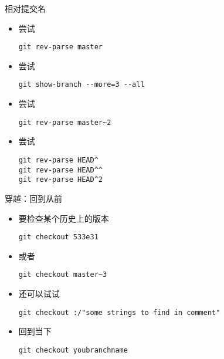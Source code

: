 \begin{frame}[<+->][fragile]{相对提交名}
    \begin{itemize}
        \item 尝试
\begin{Verbatim}[frame=single,commandchars=\\\{\}]
git rev-parse master
\end{Verbatim}
        \item 尝试
\begin{Verbatim}[frame=single,commandchars=\\\{\}]
git show-branch --more=3 --all
\end{Verbatim}
        \item 尝试
\begin{Verbatim}[frame=single,commandchars=\\\{\}]
git rev-parse master~2
\end{Verbatim}
        \item 尝试
\begin{Verbatim}[frame=single,commandchars=\\\{\}]
git rev-parse HEAD^
git rev-parse HEAD^^
git rev-parse HEAD^2
\end{Verbatim}
    \end{itemize}
\end{frame}

\begin{frame}[<+->][fragile]{穿越：回到从前}
    \begin{itemize}
        \item 要检查某个历史上的版本
\begin{Verbatim}[frame=single,commandchars=\\\{\}]
git checkout 533e31
\end{Verbatim}
        \item 或者
\begin{Verbatim}[frame=single,commandchars=\\\{\}]
git checkout master~3
\end{Verbatim}
        \item 还可以试试
\begin{Verbatim}[frame=single,commandchars=\\\{\}]
git checkout :/"some strings to find in comment"
\end{Verbatim}
        \item 回到当下
\begin{Verbatim}[frame=single,commandchars=\\\{\}]
git checkout youbranchname
\end{Verbatim}
    \end{itemize}
\end{frame}
